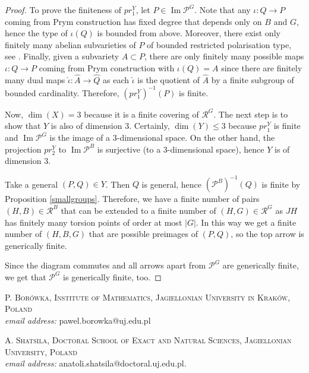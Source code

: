 \documentclass{amsart}
\theoremstyle{remark}
\numberwithin{equation}{section}
\DeclareMathOperator{\im}{Im}
\begin{document}
\begin{proof}
To prove the finiteness of $pr_1^Y$, let $P \in \im \mathcal{P}^G$. Note that any $\iota: Q \to P$ coming from Prym construction has fixed degree that depends only on $B$ and $G$, hence the type of $\iota(Q)$ is bounded from above. Moreover, there exist only finitely many abelian subvarieties of $P$ of bounded restricted polarisation type, see \cite{BLfinite}. Finally, given a subvariety $A \subset P$, there are only finitely many possible maps $\iota: Q \to P$ coming from Prym construction with $\iota(Q) = A$ since there are finitely many dual maps $\widehat{\iota}: \widehat{A} \to \widehat{Q}$ as each $\widehat{\iota}$ is the quotient of $\widehat{A}$ by a finite subgroup of bounded cardinality. Therefore, $(pr_1^Y)^{-1}(P)$ is finite.

Now, $\dim(X)=3$ because it is a finite covering of $\mathcal{R}^G$. The next step is to show that $Y$ is also of dimension $3$. Certainly, $\dim(Y)\leq 3$ because $pr^Y_1$ is finite and $\im\mathcal{P}^G$ is the image of a $3$-dimensional space. On the other hand, the projection $pr^Y_2$ to $\im\mathcal{P}^B$ is surjective (to a $3$-dimensional space), hence $Y$ is of dimension 3.

Take a general $(P,Q)\in Y$. Then $Q$ is general, hence $(\mathcal{P}^B)^{-1}(Q)$ is finite by Proposition \ref{smallgroups}. Therefore, we have a finite number of pairs $(H,B)\in\mathcal{R}^B$ that can be extended to a finite number of $(H,G)\in\mathcal{R}^G$ as $JH$ has finitely many torsion points of order at most $|G|$. In this way we get a finite number of $(H,B,G)$ that are possible preimages of $(P,Q)$, so the top arrow is generically finite. 

Since the diagram commutes and all arrows apart from $\mathcal{P}^G$ are generically finite, we get that $\mathcal{P}^G$ is generically finite, too.



        \end{proof}









\textsc{P. Bor\'owka, Institute of Mathematics, Jagiellonian University in Krak\'ow, Poland}\\
\textit{email address:} pawel.borowka@uj.edu.pl

\textsc{A. Shatsila, Doctoral School of Exact and Natural Sciences, Jagiellonian University, Poland}\\
\textit{email address:} anatoli.shatsila@doctoral.uj.edu.pl.
\end{document}
